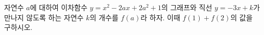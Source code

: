 자연수 $a$에 대하여 이차함수 $y=x^2-2ax+2a^2+1$의 그래프와 직선 $y=-3x+k$가 만나지 않도록 하는 자연수 $k$의 개수를 $f(a)$라 하자. 이때 $f(1)+f(2)$의 값을 구하시오.
